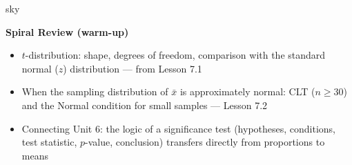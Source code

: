 \documentclass[10pt]{article}
\begin{document}
\begin{skillbox}{sky}
\begin{minipage}[t]{0.55\linewidth}\vspace{0pt}
    \textbf{Spiral Review (warm-up)}
    \begin{itemize}
        \item $t$-distribution: shape, degrees of freedom, comparison with the standard
              normal ($z$) distribution --- from Lesson 7.1
        \item When the sampling distribution of $\bar x$ is approximately normal:
              CLT ($n \ge 30$) and the Normal condition for small samples --- Lesson 7.2
        \item Connecting Unit 6: the logic of a significance test (hypotheses,
              conditions, test statistic, $p$-value, conclusion) transfers directly
              from proportions to means
    \end{itemize}
\end{minipage}
\hfill
\begin{minipage}[t]{0.38\linewidth}\vspace{0pt}\centering
\end{minipage}
\end{skillbox}
\end{document}
